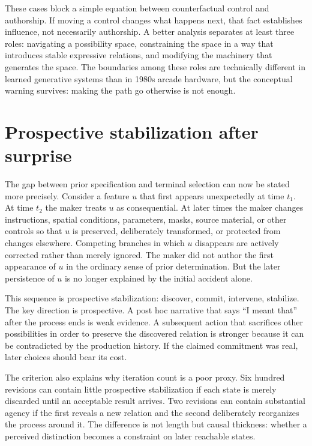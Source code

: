\documentclass[11pt]{article}
\begin{document}
These cases block a simple equation between counterfactual control and authorship. If moving a control changes what happens next, that fact establishes influence, not necessarily authorship. A better analysis separates at least three roles: navigating a possibility space, constraining the space in a way that introduces stable expressive relations, and modifying the machinery that generates the space. The boundaries among these roles are technically different in learned generative systems than in 1980s arcade hardware, but the conceptual warning survives: making the path go otherwise is not enough.

\section{Prospective stabilization after surprise}
The gap between prior specification and terminal selection can now be stated more precisely. Consider a feature $u$ that first appears unexpectedly at time $t_1$. At time $t_2$ the maker treats $u$ as consequential. At later times the maker changes instructions, spatial conditions, parameters, masks, source material, or other controls so that $u$ is preserved, deliberately transformed, or protected from changes elsewhere. Competing branches in which $u$ disappears are actively corrected rather than merely ignored. The maker did not author the first appearance of $u$ in the ordinary sense of prior determination. But the later persistence of $u$ is no longer explained by the initial accident alone.

This sequence is prospective stabilization: discover, commit, intervene, stabilize. The key direction is prospective. A post hoc narrative that says ``I meant that'' after the process ends is weak evidence. A subsequent action that sacrifices other possibilities in order to preserve the discovered relation is stronger because it can be contradicted by the production history. If the claimed commitment was real, later choices should bear its cost.

The criterion also explains why iteration count is a poor proxy. Six hundred revisions can contain little prospective stabilization if each state is merely discarded until an acceptable result arrives. Two revisions can contain substantial agency if the first reveals a new relation and the second deliberately reorganizes the process around it. The difference is not length but causal thickness: whether a perceived distinction becomes a constraint on later reachable states.
\end{document}
